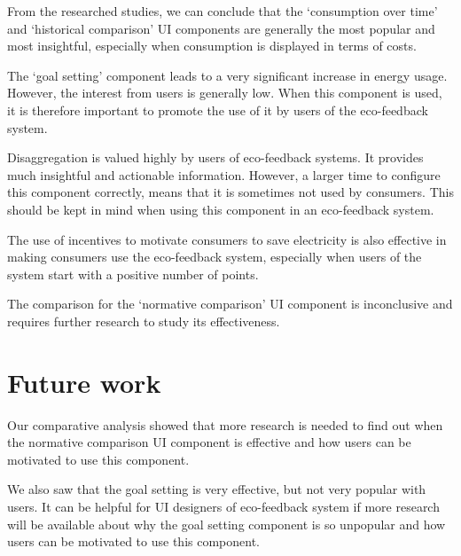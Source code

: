 \documentclass[journal]{vgtc}                %
\begin{document}
From the researched studies, we can conclude that the `consumption over time' and `historical comparison' UI components are generally the most popular and most insightful, especially when consumption is displayed in terms of costs.

The `goal setting' component leads to a very significant increase in energy usage. However, the interest from users is generally low. When this component is used, it is therefore important to promote the use of it by users of the eco-feedback system.

Disaggregation is valued highly by users of eco-feedback systems. It provides much insightful and actionable information. However, a larger time to configure this component correctly, means that it is sometimes not used by consumers. This should be kept in mind when using this component in an eco-feedback system.

The use of incentives to motivate consumers to save electricity is also effective in making consumers use the eco-feedback system, especially when users of the system start with a positive number of points.

The comparison for the `normative comparison'  UI component is inconclusive and requires further research to study its effectiveness.


\section{Future work}
Our comparative analysis showed that more research is needed to find out when the normative comparison UI component is effective and how users can be motivated to use this component.

We also saw that the goal setting is very effective, but not very popular with users. It can be helpful for UI designers of eco-feedback system if more research will be available about why the goal setting component is so unpopular and how users can be motivated to use this component.
\end{document}
